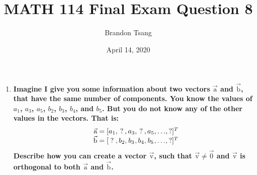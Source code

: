 \documentclass[11pt]{article}
\title{MATH 114 Final Exam Question 8}
\author{Brandon Tsang}
\date{April 14, 2020}
\begin{document}
    \maketitle
    \begin{enumerate}[label=\textbf{\arabic*.}, start=8]
        \item{
            \textbf{\boldmath Imagine I give you some information about two vectors \(\vec{\mathrm a}\) and \(\vec{\mathrm b}\), that have the same number of components. You know the values of \(a_1\), \(a_3\), \(a_5\), \(b_2\), \(b_3\), \(b_4\), and \(b_5\). But you do not know any of the other values in the vectors. That is:
            \[\begin{array}{r @{{}=[} c @{,{}} c @{,{}} c @{,{}} c @{,{}} c @{,{}} c @{,{}} c @{]^T}}
                \vec{\mathrm a}&a_1&?  &a_3&?  &a_5&\ldots&? \\
                \vec{\mathrm b}&?  &b_2&b_3&b_4&b_5&\ldots&?
            \end{array}\]
            Describe how you can create a vector \(\vec{\mathrm v}\), such that \(\vec{\mathrm v}\neq\vec{0}\) and \(\vec{\mathrm v}\) is orthogonal to both \(\vec{\mathrm a}\) and \(\vec{\mathrm b}\).}
            \par
        }
    \end{enumerate}
\end{document}

